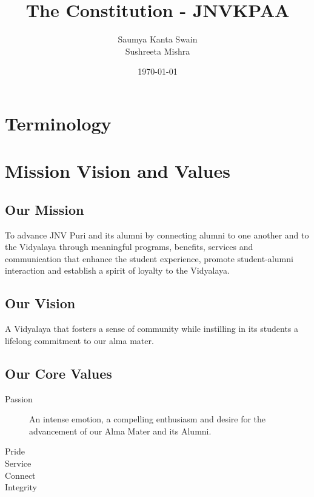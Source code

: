 \documentclass[a4paper,11pt]{book}
\title{The Constitution - JNVKPAA}
\author{Saumya Kanta Swain \\
Sushreeta Mishra}
\date{\today}
\begin{document}
\maketitle
\tableofcontents

\chapter*{Terminology}


\chapter{Mission Vision and Values}

\section{Our Mission}
To advance JNV Puri and its alumni by connecting alumni to one another 
and to the Vidyalaya through meaningful programs, benefits, services and 
communication that enhance the student experience, promote student-alumni 
interaction and establish a spirit of loyalty to the Vidyalaya.

\section{Our Vision}
A Vidyalaya that fosters a sense of community while instilling in its students 
a lifelong commitment to our alma mater.

\section{Our Core Values}
\begin{description}
\item [Passion] An intense emotion, a compelling enthusiasm and desire for the 
advancement of our Alma Mater and its Alumni.
\item [Pride] 
\item [Service]
\item [Connect]
\item [Integrity]
\end{description}
\end{document}
